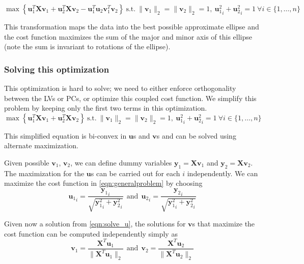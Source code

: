 \documentclass[10pt,a4paper]{article}
\newcommand{\bu}{\mathbf{u}}
\newcommand{\bv}{\mathbf{v}}
\begin{document}
\begin{equation}
\max \left\{\mathbf{u}_1^T \mathbf{X} \mathbf{v}_1 + \mathbf{u}_2^T \mathbf{X} \mathbf{v}_2 - \bu_1^T\bu_2\bv_1^T\bv_2\right\} ~\textrm{s.t.}~ \|\mathbf{v}_1\|_2 = \|\mathbf{v}_2\|_2=1,~ {\mathbf{u}_1^2}_i + {\mathbf{u}_2^2}_i = 1~ \forall i\in \{1,\ldots,n\}
\label{eqn:generalproblem}
\end{equation}

This transformation maps the data into the best possible approximate ellipse and the cost function maximizes the sum of the major and minor axis of this ellipse (note the sum is invariant to rotations of the ellipse).

\subsubsection*{Solving this optimization}
This optimization is hard to solve; we need to either enforce orthogonality between the LVs or PCs, or optimize this coupled cost function. We simplify this problem  by keeping only the first two terms in this optimization. 
\begin{equation}
\max \left\{\mathbf{u}_1^T \mathbf{X} \mathbf{v}_1 + \mathbf{u}_2^T \mathbf{X} \mathbf{v}_2 \right\} ~\textrm{s.t.}~ \|\mathbf{v}_1\|_2 = \|\mathbf{v}_2\|_2=1,~ {\mathbf{u}_1^2}_i + {\mathbf{u}_2^2}_i = 1~ \forall i\in \{1,\ldots,n\}
\end{equation}

This simplified equation is bi-convex in $\textbf{u}$s and $\textbf{v}$s  and can be solved using alternate maximization.

Given possible $\mathbf{v}_1$, $\mathbf{v}_2$, we can define dummy variables $\mathbf{y}_1 = \mathbf{X}\mathbf{v}_1$ and $\mathbf{y}_2 = \mathbf{X}\mathbf{v}_2$. The maximization for the $\mathbf{u}$s can be carried out for each $i$ independently. We can maximize the cost function in \eqref{eqn:generalproblem} by choosing
\begin{equation}
{\mathbf{u}_1}_i = \frac{{\mathbf{y}_1}_i}{\sqrt{{\mathbf{y}_1^2}_i + {\mathbf{y}_2^2}_i}} ~~\textrm{and}~~ {\mathbf{u}_2}_i = \frac{{\mathbf{y}_2}_i}{\sqrt{{\mathbf{y}_1^2}_i + {\mathbf{y}_2^2}_i}}
\label{eqn:solve_u}
\end{equation}

Given now a solution from \eqref{eqn:solve_u}, the solutions for $\mathbf{v}$s that maximize the cost function can be computed independently simply as
\begin{equation}
 \mathbf{v}_1 = \frac{\mathbf{X}^T\mathbf{u}_1}{\|\mathbf{X}^T\mathbf{u}_1\|_2} ~~\textrm{and}~~ \mathbf{v}_2 = \frac{\mathbf{X}^T\mathbf{u}_2}{\|\mathbf{X}^T\mathbf{u}_2\|_2}
 \label{eqn:solve_v}
 \end{equation} 
 
\end{document}
